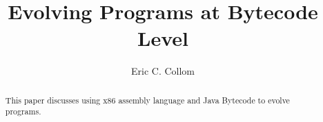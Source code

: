 \documentclass{sig-alternate}
\begin{document}
%

\title{
Evolving Programs at Bytecode Level
}
%
%
%
%
%

%
\author{
%
%
\alignauthor
Eric C. Collom
}

\maketitle
\begin{abstract}
This paper discusses using x86 assembly language and Java Bytecode to evolve programs. 
\end{abstract}
\end{document}

